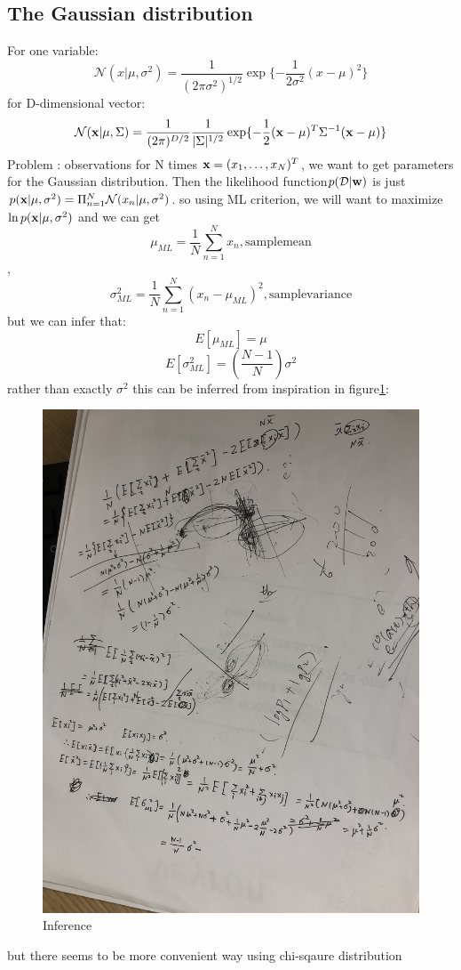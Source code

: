 \documentclass[a4paper]{book}
\begin{document}
\subsection{The Gaussian distribution}
For one variable:
\begin{equation}\label{eq1.3}
  \mathcal{N}(x|\mu,\sigma^2) = \frac{1}{(2\pi\sigma^2)^{1/2}}\exp\{-\frac1{2\sigma^2}(x-\mu)^2\}
\end{equation}
for D-dimensional vector:
\begin{equation}\label{eq1.4}
  \mathcal{N}(\textbf x|\mu, \Sigma) = \frac{1}{(2\pi)^{D/2}}\frac1{|\Sigma|^{1/2}}\exp\{-\frac12(\textbf x-\mu)^T\Sigma^{-1}(\textbf x-\mu)\}
\end{equation}
Problem : observations for N times $\textbf x=(x_1,\dots,x_N)^T$,  we want to get parameters for the Gaussian distribution.
Then the likelihood function$p(\mathcal{D}|\textbf w)$ is just $p(\textbf x|\mu, \sigma^2) = \Pi_{n=1}^{N}\mathcal{N}(x_n|\mu,\sigma^2)$.
so using ML criterion, we will want to maximize $\ln p(\textbf x|\mu,\sigma^2)$ and we can get
$$\mu_{ML} = \frac1N\sum_{n=1}^Nx_n, \mathrm{sample mean}$$,
$$\sigma_{ML}^2 = \frac1N\sum_{n=1}^N(x_n-\mu_{ML})^2, \mathrm{sample variance}$$
but we can infer that:
$$E[\mu_{ML}] = \mu$$
$$E[\sigma_{ML}^2] = (\frac{N-1}N)\sigma^2$$ rather than exactly $\sigma^2$
this can be inferred from inspiration in figure\ref{fig1.1}:
\begin{figure}
  \centering
  \includegraphics[width=\linewidth]{./imgs/infer1.jpg}
  \caption{Inference}\label{fig1.1}
\end{figure}
but there seems to be more convenient way using chi-sqaure distribution
\end{document}
